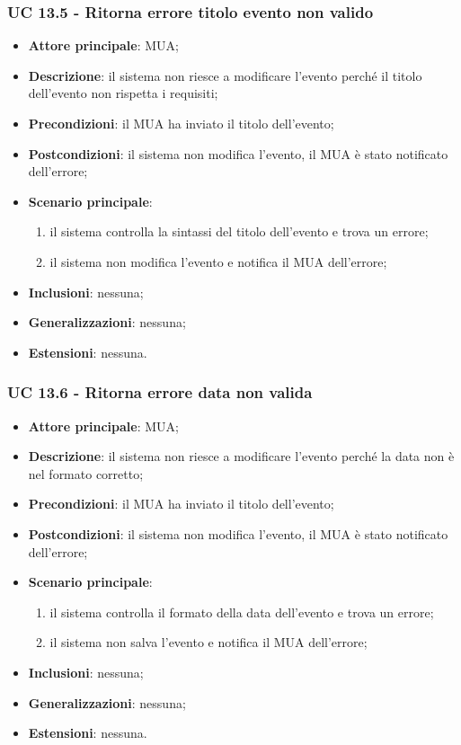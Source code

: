     \subsubsection{UC 13.5 - Ritorna errore titolo evento non valido} \label{sec:UC13.5}
    \begin{itemize}
        \item \textbf{Attore principale}: MUA;
        \item \textbf{Descrizione}: il sistema non riesce a modificare l'evento perché il titolo dell'evento non rispetta i requisiti;
        \item \textbf{Precondizioni}: il MUA ha inviato il titolo dell'evento;
        \item \textbf{Postcondizioni}: il sistema non modifica l'evento, il MUA è stato notificato dell'errore;
        \item \textbf{Scenario principale}:
            \begin{enumerate}
                \item il sistema controlla la sintassi del titolo dell'evento e trova un errore;
                \item il sistema non modifica l'evento e notifica il MUA dell'errore;
            \end{enumerate}
        \item \textbf{Inclusioni}: nessuna;
        \item \textbf{Generalizzazioni}: nessuna;
        \item \textbf{Estensioni}: nessuna.
    \end{itemize}


    \subsubsection{UC 13.6 - Ritorna errore data non valida} \label{sec:UC13.6}
    \begin{itemize}
        \item \textbf{Attore principale}: MUA;
        \item \textbf{Descrizione}: il sistema non riesce a modificare l'evento perché la data non è nel formato corretto;
        \item \textbf{Precondizioni}: il MUA ha inviato il titolo dell'evento;
        \item \textbf{Postcondizioni}: il sistema non modifica l'evento, il MUA è stato notificato dell'errore;
        \item \textbf{Scenario principale}:
            \begin{enumerate}
                \item il sistema controlla il formato della data dell'evento e trova un errore;
                \item il sistema non salva l'evento e notifica il MUA dell'errore;
            \end{enumerate}
        \item \textbf{Inclusioni}: nessuna;
        \item \textbf{Generalizzazioni}: nessuna;
        \item \textbf{Estensioni}: nessuna.
    \end{itemize}

